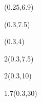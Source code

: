 \begin{textblock*}{\paperwidth}(0.25\TPHorizModule,6.9\TPVertModule)
  \fbox{\textcolor{white}{\rule{0.97\TPHorizModule}{2.0\TPVertModule}}}
\end{textblock*}
\begin{textblock*}{\paperwidth}(0.3\TPHorizModule,7.5\TPVertModule)
  \authorfmt
\end{textblock*}

\null\cleardoublepage


\begin{textblock*}{\paperwidth}(0.3\TPHorizModule,4\TPVertModule)
  \titlefmt
\end{textblock*}

\begin{textblock*}{2\TPHorizModule}(0.3\TPHorizModule,7.5\TPVertModule)
  \authorfmt
\end{textblock*}

\begin{textblock*}{2\TPHorizModule}(0.3\TPHorizModule,10\TPVertModule)
  \affiliation
\end{textblock*}

\begin{textblock*}{1.7\TPHorizModule}(0.3\TPHorizModule,30\TPVertModule)
  \edition
\end{textblock*}
\endgroup

